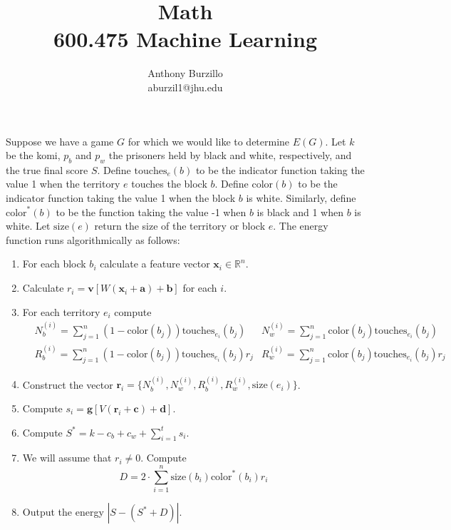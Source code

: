 \documentclass{amsart}
\title{Math\\600.475 Machine Learning}
\author{Anthony Burzillo\\aburzil1@jhu.edu}
\def\v#1{\mathbf{#1}}
\begin{document}
\maketitle

\def\touches#1#2{\mbox{touches}_{#1}{\left(#2\right)}}
\def\color#1{\mbox{color}{\left(#1\right)}}
\def\colorp#1{\mbox{color}^*{\left(#1\right)}}
\def\size#1{\mbox{size}{\left(#1\right)}}

Suppose we have a game $G$ for which we would like to determine $E(G)$. Let $k$ be the komi, $p_b$ and $p_w$ the prisoners
held by black and white, respectively, and the true final score $S$. Define $\touches{ e }{ b }$ to be the indicator function
taking the value 1 when the territory $e$ touches the block $b$. Define $\color{ b }$ to be the indicator function taking the
value 1 when the block $b$ is white. Similarly, define $\colorp{ b }$ to be the function taking the value -1 when $b$ is black and
1 when $b$ is white. Let $\size{ e }$ return the size of the territory or block $e$. The energy function runs algorithmically as follows:
\begin{enumerate}
  \item For each block $b_i$ calculate a feature vector $\v{ x }_i \in \mathbb{ R }^n$.
  \item Calculate $r_i = \v{ v } [W(\v{ x }_i + \v{ a }) + \v{ b }]$ for each $i$.
  \item For each territory $e_i$ compute
    \begin{align*}
      &N_b^{ (i) } = \sum_{ j = 1 }^n (1 - \color{ b_j }) \touches{ e_i }{ b_j }
      &N_w^{ (i) } = \sum_{ j = 1 }^n \color{ b_j } \touches{ e_i }{ b_j }\\
      &R_b^{ (i) } = \sum_{ j = 1 }^n (1 - \color{ b_j }) \touches{ e_i }{ b_j } r_j
      &R_w^{ (i) } = \sum_{ j = 1 }^n \color{ b_j } \touches{ e_i }{ b_j } r_j
    \end{align*}
  \item Construct the vector $\v{ r }_i = \{ N_b^{ (i) }, N_w^{ (i) }, R_b^{ (i) }, R_w^{ (i) }, \size{ e_i } \}$.
  \item Compute $s_i = \v{ g } [V(\v{ r }_i + \v{ c }) + \v{ d }]$.
  \item Compute $S^* = k - c_b + c_w + \sum_{ i = 1 }^t s_i$.
  \item We will assume that $r_i \neq 0$. Compute
    $$D = 2 \cdot \sum_{ i = 1 }^n \size{ b_i } \colorp{ b_i } r_i$$
  \item Output the energy $|S - (S^* + D)|$.
\end{enumerate}
\end{document}
